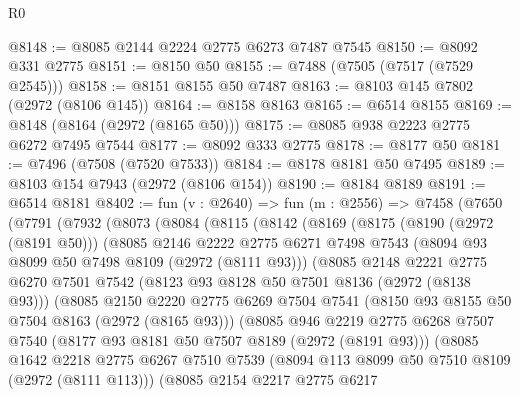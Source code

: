 \begin{lexlean}{R0}
\begin{coremodule}
@8148 := @8085 @2144 @2224 @2775 @6273 @7487 @7545
@8150 := @8092 @331 @2775
@8151 := @8150 @50
@8155 := @7488 (@7505 (@7517 (@7529 @2545)))
@8158 := @8151 @8155 @50 @7487
@8163 := @8103 @145 @7802 (@2972 (@8106 @145))
@8164 := @8158 @8163
@8165 := @6514 @8155
@8169 := @8148 (@8164 (@2972 (@8165 @50)))
@8175 := @8085 @938 @2223 @2775 @6272 @7495 @7544
@8177 := @8092 @333 @2775
@8178 := @8177 @50
@8181 := @7496 (@7508 (@7520 @7533))
@8184 := @8178 @8181 @50 @7495
@8189 := @8103 @154 @7943 (@2972 (@8106 @154))
@8190 := @8184 @8189
@8191 := @6514 @8181
@8402 := fun (v : @2640) =>
  fun (m : @2556) =>
  @7458
    (@7650
      (@7791
        (@7932
          (@8073
            (@8084
              (@8115
                (@8142
                  (@8169
                    (@8175
                      (@8190 (@2972 (@8191 @50)))
                      (@8085
                        @2146
                        @2222
                        @2775
                        @6271
                        @7498
                        @7543
                        (@8094 @93 @8099 @50 @7498 @8109 (@2972 (@8111 @93)))
                        (@8085
                          @2148
                          @2221
                          @2775
                          @6270
                          @7501
                          @7542
                          (@8123 @93 @8128 @50 @7501 @8136 (@2972 (@8138 @93)))
                          (@8085
                            @2150
                            @2220
                            @2775
                            @6269
                            @7504
                            @7541
                            (@8150 @93 @8155 @50 @7504 @8163 (@2972 (@8165 @93)))
                            (@8085
                              @946
                              @2219
                              @2775
                              @6268
                              @7507
                              @7540
                              (@8177 @93 @8181 @50 @7507 @8189 (@2972 (@8191 @93)))
                              (@8085
                                @1642
                                @2218
                                @2775
                                @6267
                                @7510
                                @7539
                                (@8094 @113 @8099 @50 @7510 @8109 (@2972 (@8111 @113)))
                                (@8085
                                  @2154
                                  @2217
                                  @2775
                                  @6217

\end{coremodule}
\end{lexlean}
